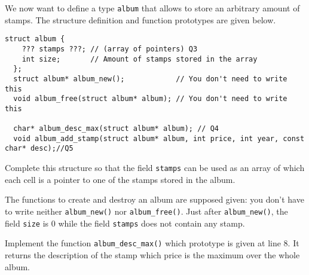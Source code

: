 \documentclass[10pt]{article}\usepackage[enonce]{exemptty}
\begin{document}
We now want to define a type \texttt{album} that allows to store an arbitrary
amount of stamps. The structure definition and function prototypes are given
below.

\begin{Verbatim}[gobble=2]
  struct album {
    ??? stamps ???; // (array of pointers) Q3
    int size;       // Amount of stamps stored in the array
  };
  struct album* album_new();            // You don't need to write this
  void album_free(struct album* album); // You don't need to write this

  char* album_desc_max(struct album* album); // Q4
  void album_add_stamp(struct album* album, int price, int year, const char* desc);//Q5
\end{Verbatim}

\vspace{-.5\baselineskip}%
\Question Complete this structure so that the field \texttt{stamps} can be used
as an array of which each cell is a pointer to one of the stamps stored in the
album.

The functions to create and destroy an album are supposed given: you don't have
to write neither \texttt{album\_new()} nor \texttt{album\_free()}. Just after
\texttt{album\_new()}, the field \texttt{size} is 0 while the field
\texttt{stamps} does not contain any stamp.

\Question Implement the function \texttt{album\_desc\_max()} which prototype is
given at line 8. It returns the description of the stamp which price is the
maximum over the whole album.
\end{document}
